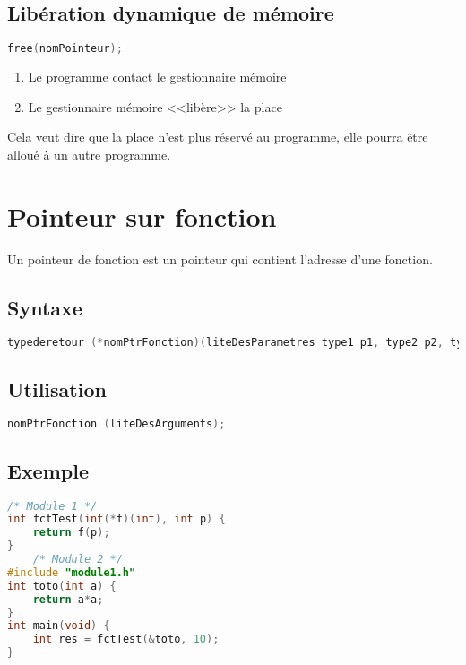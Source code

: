 \subsection{Libération dynamique de mémoire}
\begin{lstlisting}[language=C, numbers=none,frame=none, caption=Syntaxe de libération de mémoire]
free(nomPointeur);
\end{lstlisting}
\begin{enumerate}
	\item Le programme contact le gestionnaire mémoire 
	\item Le gestionnaire mémoire <<libère>> la place
\end{enumerate}

Cela veut dire que la place n'est plus réservé au programme, elle pourra être alloué à un autre programme.

\section{Pointeur sur fonction}
Un pointeur de fonction est un pointeur qui contient l'adresse d'une fonction.

\subsection{Syntaxe}
\begin{lstlisting}[language=C, numbers=none,caption=Déclaration d'un pointeur de fonction]
typederetour (*nomPtrFonction)(liteDesParametres type1 p1, type2 p2, type3 p3);
\end{lstlisting}

\subsection{Utilisation}
\begin{lstlisting}[language=C, numbers=none,caption=Utilisation d'un pointeur de fonction]
	nomPtrFonction (liteDesArguments);
\end{lstlisting}
\subsection{Exemple}
\begin{lstlisting}[language=C, numbers=none,caption=Exemple d'utilisation d'un pointeur de fonction]
	/* Module 1 */
int fctTest(int(*f)(int), int p) {
	return f(p);
}
	/* Module 2 */
#include "module1.h"
int toto(int a) {
	return a*a;
}
int main(void) {
	int res = fctTest(&toto, 10);
}

\end{lstlisting}


